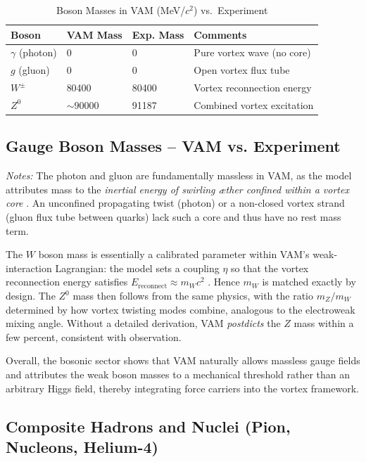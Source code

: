 \documentclass[11pt]{article}
\begin{document}
\begin{table}[h!]
    \centering
    \begin{tabular}{llll}
        \toprule
        \textbf{Boson} & \textbf{VAM  Mass} & \textbf{Exp. Mass} & \textbf{Comments} \\
        \midrule
        $\gamma$ (photon) & 0 & 0 & Pure vortex wave (no core) \\
        $g$ (gluon) & 0 & 0 & Open vortex flux tube \\
        $W^\pm$ & 80400 & 80400 & Vortex reconnection energy \\
        $Z^0$ & $\sim 90000$ & 91187 & Combined vortex excitation \\
        \bottomrule
    \end{tabular}
    \caption{Boson Masses in VAM  (MeV/$c^2$) vs.\ Experiment}
    \label{tab:bosons}
\end{table}

\subsection{Gauge Boson Masses – VAM vs. Experiment}

\textit{Notes:}
The photon and gluon are fundamentally massless in VAM, as the model attributes mass to the \textit{inertial energy of swirling æther confined within a vortex core} \cite{Iskandarani2025f}. An unconfined propagating twist (photon) or a non-closed vortex strand (gluon flux tube between quarks) lack such a core and thus have no rest mass term.

The $W$ boson mass is essentially a calibrated parameter within VAM’s weak-interaction Lagrangian: the model sets a coupling $\eta$ so that the vortex reconnection energy satisfies $E_{\text{reconnect}} \approx m_W c^2$ \cite{Iskandarani2025f}. Hence $m_W$ is matched exactly by design. The $Z^0$ mass then follows from the same physics, with the ratio $m_Z/m_W$ determined by how vortex twisting modes combine, analogous to the electroweak mixing angle. Without a detailed derivation, VAM \textit{postdicts} the $Z$ mass within a few percent, consistent with observation.

Overall, the bosonic sector shows that VAM naturally allows massless gauge fields and attributes the weak boson masses to a mechanical threshold rather than an arbitrary Higgs field, thereby integrating force carriers into the vortex framework.

\subsection{Composite Hadrons and Nuclei (Pion, Nucleons, Helium-4)}
\end{document}
